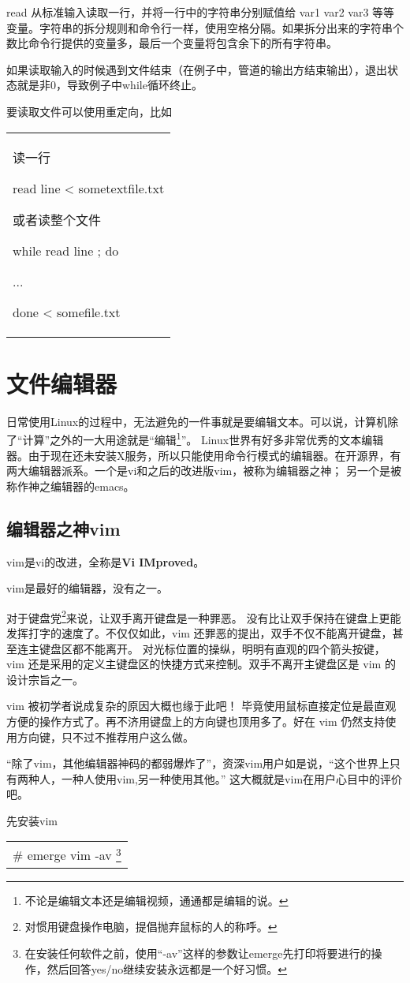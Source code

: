 \documentclass[amstex,twoside]{ctexbook}
\newenvironment{code}{\small\tt\begin{longtable}{p{0.8\textwidth}}}{\end{longtable}}
\begin{document}
read 从标准输入读取一行，并将一行中的字符串分别赋值给 var1 var2 var3 等等变量。字符串的拆分规则和命令行一样，使用空格分隔。如果拆分出来的字符串个数比命令行提供的变量多，最后一个变量将包含余下的所有字符串。

如果读取输入的时候遇到文件结束（在例子中，管道的输出方结束输出），退出状态就是非0，导致例子中while循环终止。

要读取文件可以使用重定向，比如
\begin{code}

读一行

read line < sometextfile.txt

或者读整个文件

while read line ; do

...

done < somefile.txt
\end{code}


\section{文件编辑器}\label{sec:editors}

日常使用Linux的过程中，无法避免的一件事就是要编辑文本。可以说，计算机除了“计算”之外的一大用途就是“编辑\footnote{不论是编辑文本还是编辑视频，通通都是编辑的说。}”。
Linux世界有好多非常优秀的文本编辑器。由于现在还未安装X服务，所以只能使用命令行模式的编辑器。在开源界，有两大编辑器派系。一个是vi和之后的改进版vim，被称为编辑器之神；
另一个是被称作神之编辑器的emacs。


\subsection{编辑器之神vim}

vim是vi的改进，全称是\textbf{Vi IMproved}。	%
%
\newcommand{\keyboradparty}[1]{
#1是最好的编辑器，没有之一。


对于键盘党\footnote{对惯用键盘操作电脑，提倡抛弃鼠标的人的称呼。}来说，让双手离开键盘是一种罪恶。
没有比让双手保持在键盘上更能发挥打字的速度了。不仅仅如此，#1 还罪恶的提出，双手不仅不能离开键盘，甚至连主键盘区都不能离开。
对光标位置的操纵，明明有直观的四个箭头按键， #1 还是采用的定义主键盘区的快捷方式来控制。双手不离开主键盘区是  #1 的设计宗旨之一。

#1 被初学者说成复杂的原因大概也缘于此吧！ 毕竟使用鼠标直接定位是最直观方便的操作方式了。再不济用键盘上的方向键也顶用多了。好在 #1 仍然支持使用方向键，只不过不推荐用户这么做。

“除了#1，其他编辑器神码的都弱爆炸了”，资深#1用户如是说，“这个世界上只有两种人，一种人使用#1,另一种使用其他。” 这大概就是{}#1{}在用户心目中的评价吧。

先安装#1

\begin{code}
\# emerge #1 -av \footnote{在安装任何软件之前，使用“-av”这样的参数让emerge先打印将要进行的操作，然后回答yes/no继续安装永远都是一个好习惯。}
\end{code}

}
%
\keyboradparty{vim}
\end{document}
